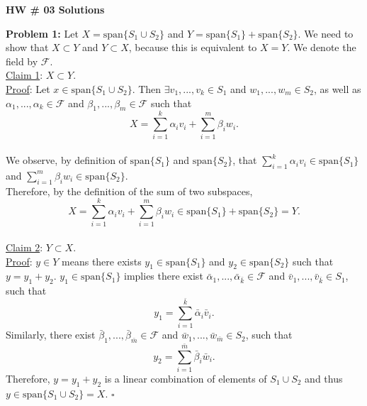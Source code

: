 \documentclass[letterpaper]{article}
\begin{document}
\newcommand{\trace}{\mathrm{trace}}
\newcommand{\real}{\mathbb R}  %
\newcommand{\nat}{\mathbb R}   %
\newcommand{\cp}{\mathbb C}    %
\newcommand{\ds}{\displaystyle}
\newcommand{\mf}[2]{\frac{\ds #1}{\ds #2}}
\newcommand{\book}[2]{{Luenberger, Page~#1, }{Prob.~#2}}
\newcommand{\spanof}[1]{\textrm{span} \{ #1 \}}
\parindent 0pt


\begin{center}
{\large \bf HW \# 03 Solutions}
\end{center}

\vspace*{1cm}

\noindent \textbf{Problem 1:}  Let $X = \spanof{S_1 \cup S_2}$ and $Y = \spanof{S_1}+\spanof{S_2}$. We need to show that $X\subset Y$ and $ Y \subset X$, because this is equivalent to $X=Y$. We denote the field by $\mathcal{F}$.
\medskip \\
\underline{Claim 1}: $X \subset Y$.
\medskip \\
\underline{Proof}: Let $x \in \spanof{S_1 \cup S_2}$. Then $\exists v_1, ..., v_k \in S_1$ and $ w_1, ..., w_m \in S_2$, as well as $\alpha_1, ..., \alpha_k \in \mathcal{F}$ and $\beta_1, ..., \beta_m \in \mathcal{F}$ such that
$$X = \sum \limits_{i=1}^{k}\alpha_i v_i+\sum \limits_{i=1}^{m}\beta_i w_i.$$\\
We observe, by definition of $\spanof{S_1}$ and $\spanof{S_2}$, that $\sum \limits_{i=1}^{k}\alpha_i v_i \in \spanof{S_1}$ and
$\sum \limits_{i=1}^{m}\beta_i w_i \in \spanof{S_2}$.\\

Therefore, by the definition of the sum of two subspaces,
$$X = \sum \limits_{i=1}^{k}\alpha_i v_i+\sum \limits_{i=1}^{m}\beta_i w_i \in  \spanof{S_1}+\spanof{S_2}=Y.$$
\medskip \\
\underline{Claim 2}: $Y \subset X$.
\medskip \\
\underline{Proof}: $y\in Y$ means there exists $y_1 \in \spanof{S_1}$ and $y_2 \in \spanof{S_2}$ such that $y = y_1 +y_2$. $y_1 \in \spanof{S_1}$ implies there exist $\bar{\alpha}_1,...,\bar{\alpha}_{\bar{k}} \in \mathcal{F}$ and $ \bar{v}_1,...,\bar{v}_{\bar{k}} \in S_1$, such that
$$y_1 = \sum\limits_{i=1}^{\bar{k}} \bar{\alpha}_i \bar{v}_i.$$
Similarly, there exist $\bar{\beta}_1, ...,\bar{\beta}_{\bar{m}} \in \mathcal{F}$ and $\bar{w}_1, ...,\bar{w}_{\bar{m}} \in S_2$, such that
$$y_2 = \sum\limits_{i=1}^{\bar{m}} \bar{\beta}_i \bar{w}_i.$$
Therefore, $y=y_1+y_2$ is a linear combination of elements of $S_1 \cup S_2$ and thus $y\in\spanof{S_1 \cup S_2}=X$. \hfill $\square$
\end{document}
